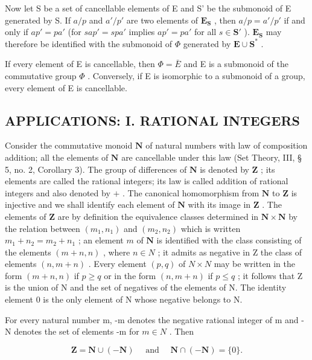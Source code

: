 Now let S be a set of cancellable elements of E and S' be the submonoid of E generated by S. If \(a/p\) and \(a'/p'\) are two elements of \(\mathbf{E}_{\mathbf{S}}\) , then \(a/p = a'/p'\) if and only if \(ap' = pa'\) (for \(sap' = spa'\) implies \(ap' = pa'\) for all \(s \in \mathbf{S}'\) ). \(\mathbf{E}_{\mathbf{S}}\) may therefore be identified with the submonoid of \(\Phi\) generated by \(\mathbf{E} \cup \mathbf{S}^*\) .

If every element of E is cancellable, then \(\Phi = \bar{E}\) and E is a submonoid of the commutative group \(\Phi\) . Conversely, if E is isomorphic to a submonoid of a group, every element of E is cancellable.

\subsection{APPLICATIONS: I. RATIONAL INTEGERS}

Consider the commutative monoid \(\mathbf{N}\) of natural numbers with law of composition addition; all the elements of \(\mathbf{N}\) are cancellable under this law (Set Theory, III, § 5, no. 2, Corollary 3). The group of differences of \(\mathbf{N}\) is denoted by \(\mathbf{Z}\) ; its elements are called the rational integers; its law is called addition of rational integers and also denoted by \(+\) . The canonical homomorphism from \(\mathbf{N}\) to \(\mathbf{Z}\) is injective and we shall identify each element of \(\mathbf{N}\) with its image in \(\mathbf{Z}\) . The elements of \(\mathbf{Z}\) are by definition the equivalence classes determined in \(\mathbf{N} \times \mathbf{N}\) by the relation between \((m_1, n_1)\) and \((m_2, n_2)\) which is written \(m_1 + n_2 = m_2 + n_1\) ; an element \(m\) of \(\mathbf{N}\) is identified with the class consisting of the elements \((m + n, n)\) , where \(n \in N\) ; it admits as negative in Z the class of elements \((n, m + n)\) . Every element \((p, q)\) of \(N \times N\) may be written in the form \((m + n, n)\) if \(p \geqslant q\) or in the form \((n, m + n)\) if \(p \leqslant q\) ; it follows that Z is the union of N and the set of negatives of the elements of N. The identity element 0 is the only element of N whose negative belongs to N.

For every natural number m, -m denotes the negative rational integer of m and -N denotes the set of elements -m for \(m \in N\) . Then

\[
\mathbf {Z} = \mathbf {N} \cup (- \mathbf {N}) \quad \text { and } \quad \mathbf {N} \cap (- \mathbf {N}) = \{0 \}.
\]

